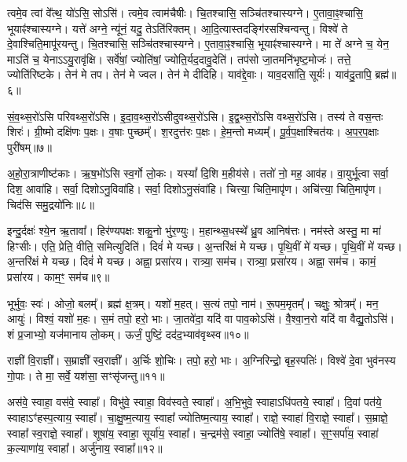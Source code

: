   त्वमे॒व त्वां वे᳚त्थ॒ यो॑ऽसि॒ सोऽसि॑।
   त्वमे॒व त्वाम॑चैषीः।
   चि॒तश्चासि॒ सञ्चि॑तश्चास्यग्ने।
   ए॒तावा॒ꣴ॒श्चासि॒ भूयाꣴ॑श्चास्यग्ने।
   यत्ते॑ अग्ने॒ न्यू॑नं॒ यदु॒ तेऽति॑रिक्तम्।
   आ॒दि॒त्यास्तदङ्गि॑रस\-श्चिन्वन्तु।
   विश्वे॑ ते दे॒वाश्चिति॒मापू॑रयन्तु।
   चि॒तश्चासि॒ सञ्चि॑तश्चास्यग्ने।
   ए॒तावा॒ꣴ॒श्चासि॒ भूयाꣴ॑श्चास्यग्ने।
   मा ते॑ अग्ने च॒ येन॒ माऽति॑ च॒ येनाऽऽयु॒रावृ॑क्षि।
   सर्वे॑षां॒ ज्योति॑षां॒ ज्योति॒र्यद॒दावु॒देति॑।
   तप॑सो जा॒तमनि॑भृष्ट॒मोजः॑।
   तत्ते॒ ज्योति॑रिष्टके।
   तेन॑ मे तप।
   तेन॑ मे ज्वल।
   तेन॑ मे दीदिहि।
   याव॑द्दे॒वाः।
   याव॒दसा॑ति॒ सूर्यः॑।
   याव॑दु॒तापि॒ ब्रह्म॑॥६॥
\anuvakamend

   सं॒व॒थ्स॒रो॑ऽसि परिवथ्स॒रो॑\-ऽसि।
   इ॒दा॒व॒थ्स॒रो॑ऽसीदुवथ्स॒रो॑\-ऽसि।
   इ॒द्व॒थ्स॒रो॑ऽसि वथ्स॒रो॑\-ऽसि।
   तस्य॑ ते वस॒न्तः शिरः॑।
   ग्री॒ष्मो दक्षि॑णः प॒क्षः।
   व॒षाः पुच्छम्᳚।
   श॒रदुत्त॑रः प॒क्षः।
   हे॒म॒न्तो मध्यम्᳚।
   पू॒र्व॒प॒क्षाश्चित॑यः।
   अ॒प॒र॒प॒क्षाः पुरी॑षम्॥७॥

   अ॒हो॒रा॒त्राणीष्ट॑काः।
   ऋ॒ष॒भो॑ऽसि स्व॒र्गो लो॒कः।
   यस्यां᳚ दि॒शि म॒हीय॑से।
   ततो॑ नो॒ मह॒ आव॑ह।
   वा॒युर्भू॒त्वा सर्वा॒ दिश॒ आवा॑हि।
   सर्वा॒ दिशोऽनु॒विवा॑हि।
   सर्वा॒ दिशोऽनु॒संवा॑हि।
   चित्त्या॒ चिति॒मापृ॑ण।
   अचि॑त्त्या॒  चिति॒मापृ॑ण।
   चिद॑सि समु॒द्रयो॑निः॥८॥

   इन्दु॒र्दक्षः॑ श्ये॒न ऋ॒तावा᳚।
   हिर॑ण्यपक्षः शकु॒नो भु॑र॒ण्युः।
   म॒हान्थ्स॒धस्थे᳚ ध्रु॒व आनिष॑त्तः।
   नम॑स्ते अस्तु॒ मा मा॑ हिꣳसीः।
   एति॒ प्रेति॒ वीति॒ समित्युदिति॑।
   दिवं॑ मे यच्छ।
   अ॒न्तरि॑क्षं मे यच्छ।
   पृ॒थि॒वीं मे॑ यच्छ।
   पृ॒थि॒वीं मे॑ यच्छ।
   अ॒न्तरि॑क्षं मे यच्छ।
   दिवं॑ मे यच्छ।
   अह्ना॒ प्रसा॑रय।
   रात्र्या॒ सम॑च।
   रात्र्या॒ प्रसा॑रय।
   अह्ना॒ सम॑च।
   कामं॒ प्रसा॑रय।
   काम॒ꣳ॒ सम॑च॥९॥
   \anuvakamend

   भूर्भुवः॒ स्वः॑।
   ओजो॒ बलम्᳚।
   ब्रह्म॑ क्ष॒त्रम्।
   यशो॑ म॒हत्।
   स॒त्यं तपो॒ नाम॑।
   रू॒पम॒मृतम्᳚।
   चक्षुः॒ श्रोत्रम्᳚।
   मन॒ आयुः॑।
   विश्वं॒ यशो॑ म॒हः।
   स॒मं तपो॒ हरो॒ भाः।
   जा॒तवे॑दा॒ यदि॑ वा पाव॒कोऽसि॑।
   वै॒श्वा॒न॒रो यदि॑ वा वैद्यु॒तोऽसि॑।
   शं प्र॒जाभ्यो॒ यज॑मानाय लो॒कम्।
   ऊर्जं॒ पुष्टिं॒ दद॑द॒भ्याव॑वृथ्स्व॥१०॥
   \anuvakamend

   राज्ञी॑ वि॒राज्ञी᳚।
   स॒म्राज्ञी᳚ स्व॒राज्ञी᳚।
   अ॒र्चिः शो॒चिः।
   तपो॒ हरो॒ भाः।
   अ॒ग्निरिन्द्रो॒ बृह॒स्पतिः॑।
   विश्वे॑ दे॒वा भुव॑नस्य गो॒पाः।
   ते मा॒ सर्वे॒ यश॑सा॒ सꣳसृ॑जन्तु॥११॥
\anuvakamend

   अस॑वे॒ स्वाहा॒ वस॑वे॒ स्वाहा᳚।
   विभु॑वे॒ स्वाहा॒ विव॑स्वते॒ स्वाहा᳚।
   अ॒भि॒भुवे॒ स्वाहाऽधि॑पतये॒ स्वाहा᳚।
   दि॒वां पत॑ये॒ स्वाहाऽꣳ॑हस्प॒त्याय॒ स्वाहा᳚।
   चा॒क्षु॒ष्म॒त्याय॒ स्वाहा᳚ ज्योतिष्म॒त्याय॒ स्वाहा᳚।
   राज्ञे॒ स्वाहा॑ वि॒राज्ञे॒ स्वाहा᳚।
   स॒म्राज्ञे॒ स्वाहा᳚ स्व॒राज्ञे॒ स्वाहा᳚।
   शूषा॑य॒ स्वाहा॒ सूर्या॑य॒ स्वाहा᳚।
   च॒न्द्रम॑से॒ स्वाहा॒ ज्योति॑षे॒ स्वाहा᳚।
   स॒ꣳ॒सर्पा॑य॒ स्वाहा॑ क॒ल्याणा॑य॒ स्वाहा᳚।
   अर्जु॑नाय॒ स्वाहा᳚॥१२॥
\anuvakamend

